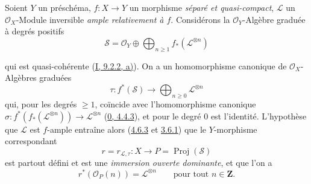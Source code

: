 \begin{env}[8.8.1]
\label{II.8.8.1-fr}
Soient $Y$ un préschéma, $f:X\to Y$ un morphisme \emph{séparé et
quasi-compact}, $\mathcal{L}$ un $\mathcal{O}_X$-Module inversible \emph{ample
relativement à $f$}. Considérons la $\mathcal{O}_Y$-Algèbre graduée à degrés
positifs
\begin{equation}
\label{II.8.8.1.1-fr}
  \mathcal{S}=\mathcal{O}_Y\oplus
  \bigoplus_{n\geqslant 1}f_*(\mathcal{L}^{\otimes n})
\tag{8.8.1.1}
\end{equation}

qui est quasi-cohérente (\hyperref[I.9.2.2-fr]{I, 9.2.2, a)}). On a un
homomorphisme canonique de $\mathcal{O}_X$-Algèbres graduées
\begin{equation}
\label{II.8.8.1.2-fr}
  \tau:f^*(\mathcal{S})\longrightarrow
  \bigoplus_{n\geqslant 0}\mathcal{L}^{\otimes n}
\tag{8.8.1.2}
\end{equation}
qui, pour les degrés $\geqslant 1$, coïncide avec l'homomorphisme canonique
$\sigma:f^*(f_*(\mathcal{L}^{\otimes n}))\to\mathcal{L}^{\otimes n}$
(\hyperref[0.4.4.3-fr]{0, 4.4.3}), et pour le degré $0$ est l'identité.
L'hypothèse que $\mathcal{L}$ est $f$-ample entraîne alors
(\hyperref[II.4.6.3-fr]{4.6.3} et \hyperref[II.3.6.1-fr]{3.6.1}) que le
$Y$-morphisme correspondant
\begin{equation}
\label{II.8.8.1.3-fr}
  r=r_{\mathcal{L},\tau}:X\longrightarrow
  P=\operatorname{Proj}(\mathcal{S})
\tag{8.8.1.3}
\end{equation}
est partout défini et est une \emph{immersion ouverte dominante}, et que l'on
a
\begin{equation}
\label{II.8.8.1.4-fr}
  r^*(\mathcal{O}_P(n))=\mathcal{L}^{\otimes n}
  \qquad\text{pour tout }n\in\mathbf{Z}.
\tag{8.8.1.4}
\end{equation}
\end{env}

